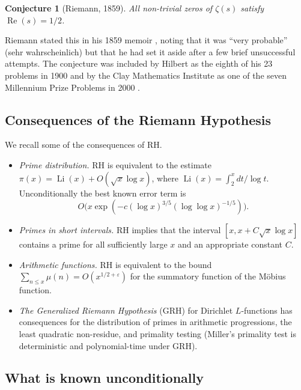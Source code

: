 \documentclass[11pt]{amsart}
\newtheorem{conjecture}[theorem]{Conjecture}
\theoremstyle{definition}
\theoremstyle{remark}
\begin{document}
\begin{conjecture}[Riemann, 1859]\label{conj:rh}
All non-trivial zeros of $\zeta(s)$ satisfy $\operatorname{Re}(s) = 1/2$.
\end{conjecture}

Riemann stated this in his 1859 memoir \cite{riemann1859}, noting that it was ``very probable'' (sehr wahrscheinlich) but that he had set it aside after a few brief unsuccessful attempts. The conjecture was included by Hilbert as the eighth of his 23 problems in 1900 and by the Clay Mathematics Institute as one of the seven Millennium Prize Problems in 2000 \cite{bombieri2000}.

\subsection{Consequences of the Riemann Hypothesis}\label{sec:consequences}

We recall some of the consequences of RH.
\begin{itemize}
\item \emph{Prime distribution.} RH is equivalent to the estimate $\pi(x) = \operatorname{Li}(x) + O(\sqrt{x}\log x)$, where $\operatorname{Li}(x) = \int_2^x dt/\log t$. Unconditionally the best known error term is
\[
O\bigl(x\exp(-c(\log x)^{3/5}(\log\log x)^{-1/5})\bigr).
\]
\item \emph{Primes in short intervals.} RH implies that the interval $[x, x + C\sqrt{x}\log x]$ contains a prime for all sufficiently large $x$ and an appropriate constant $C$.
\item \emph{Arithmetic functions.} RH is equivalent to the bound $\sum_{n \le x} \mu(n) = O(x^{1/2+\varepsilon})$ for the summatory function of the M\"obius function.
\item \emph{The Generalized Riemann Hypothesis} (GRH) for Dirichlet $L$-functions has consequences for the distribution of primes in arithmetic progressions, the least quadratic non-residue, and primality testing (Miller's primality test is deterministic and polynomial-time under GRH).
\end{itemize}

\subsection{What is known unconditionally}\label{sec:known}
\end{document}
